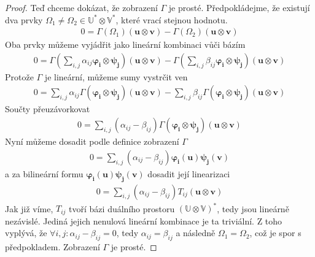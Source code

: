 \documentclass[a5paper,12pt]{amsbook}
\theoremstyle{definition}
\newcommand{\myvec}[1]{\mathbf{#1}}
\newcommand{\myspace}[1]{\mathbb{#1}}
\begin{document}
\begin{proof}
\medskip\noindent
Teď chceme dokázat, že zobrazení $\Gamma$ je prosté. Předpokládejme, že existují dva prvky
$\Omega_1\neq\Omega_2\in\myspace{U^*}\otimes\myspace{V^*}$, které vrací stejnou hodnotu.
\begin{equation*}
\begin{split}
0 = \Gamma(\Omega_1)(\myvec{u}\otimes\myvec{v}) - \Gamma(\Omega_2)(\myvec{u}\otimes\myvec{v})
\end{split}
\end{equation*}
Oba prvky můžeme vyjádřit jako lineární kombinaci vůči bázím
\begin{equation*}
\begin{split}
0 = \Gamma(\sum_{i,j}\alpha_{ij}\myvec{\varphi_i}\otimes\myvec{\psi_j})(\myvec{u}\otimes\myvec{v}) 
  - \Gamma(\sum_{i,j}\beta_{ij}\myvec{\varphi_i}\otimes\myvec{\psi_j})(\myvec{u}\otimes\myvec{v})
\end{split}
\end{equation*}
Protože $\Gamma$ je lineární, můžeme sumy vystrčit ven
\begin{equation*}
\begin{split}
0 = \sum_{i,j}\alpha_{ij}\Gamma(\myvec{\varphi_i}\otimes\myvec{\psi_j})(\myvec{u}\otimes\myvec{v}) 
- \sum_{i,j}\beta_{ij}\Gamma(\myvec{\varphi_i}\otimes\myvec{\psi_j})(\myvec{u}\otimes\myvec{v})
\end{split}
\end{equation*}
Součty přeuzávorkovat
\begin{equation*}
\begin{split}
0 = \sum_{i,j}(\alpha_{ij} - \beta_{ij})\Gamma(\myvec{\varphi_i}\otimes\myvec{\psi_j})
  (\myvec{u}\otimes\myvec{v})
\end{split}
\end{equation*}
Nyní můžeme dosadit podle definice zobrazení $\Gamma$
\begin{equation*}
\begin{split}
0 = \sum_{i,j}(\alpha_{ij} - \beta_{ij})\myvec{\varphi_i}(\myvec{u})\myvec{\psi_j}(\myvec{v})
\end{split}
\end{equation*}
a za bilineární formu $\myvec{\varphi_i}(\myvec{u})\myvec{\psi_j}(\myvec{v})$ dosadit její
linearizaci
\begin{equation*}
\begin{split}
0 = \sum_{i,j}(\alpha_{ij} - \beta_{ij})T_{ij}(\myvec{u}\otimes\myvec{v})
\end{split}
\end{equation*}
Jak již víme, $T_{ij}$ tvoří bázi duálního prostoru $(\myspace{U}\otimes\myspace{V})^*$, tedy
jsou lineárně nezávislé. Jediná jejich nenulová lineární kombinace je ta triviální.
Z toho vyplývá, že $\forall i,j: \alpha_{ij}-\beta_{ij} = 0$, tedy $\alpha_{ij} = \beta_{ij}$
a následně $\Omega_1 = \Omega_2$, což je spor s předpokladem. Zobrazení $\Gamma$ je prosté.


\end{proof}
\end{document}
